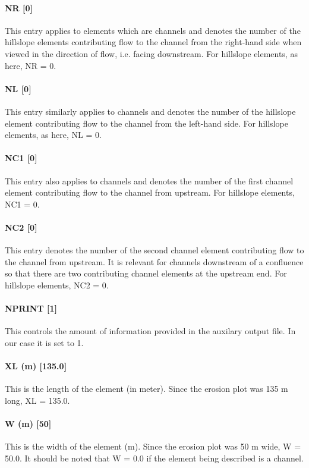 \paragraph{NR [0]}
This entry applies to elements which are channels and denotes the number of the hillslope elements contributing flow to the channel from the right-hand side when viewed in the direction of flow, i.e. facing downstream. For hillslope elements, as here, NR = 0.
 
\paragraph{NL [0]}
This entry similarly applies to channels and denotes the number of the hillslope element contributing flow to the channel from the left-hand side. For hillslope elements, as here, NL = 0.
 
\paragraph{NC1 [0]}
This entry also applies to channels and denotes the number of the first channel element contributing flow to the channel from upstream. For hillslope elements, NC1 = 0.
 
\paragraph{NC2 [0]}
This entry denotes the number of the second channel element contributing flow to the channel from upstream. It is relevant for channels downstream of a confluence so that there are two contributing channel elements at the upstream end. For hillslope elements, NC2 = 0.
 
\paragraph{NPRINT [1]}
This controls the amount of information provided in the auxilary output file. In our case it is set to 1.
 
\paragraph{XL (m) [135.0]}
This is the length of the element (in meter). Since the erosion plot was 135 m long, XL = 135.0.
 
\paragraph{W (m) [50]}
This is the width of the element (m). Since the erosion plot was 50 m wide, W = 50.0. It should be noted that W = 0.0 if the element being described is a channel.
 

